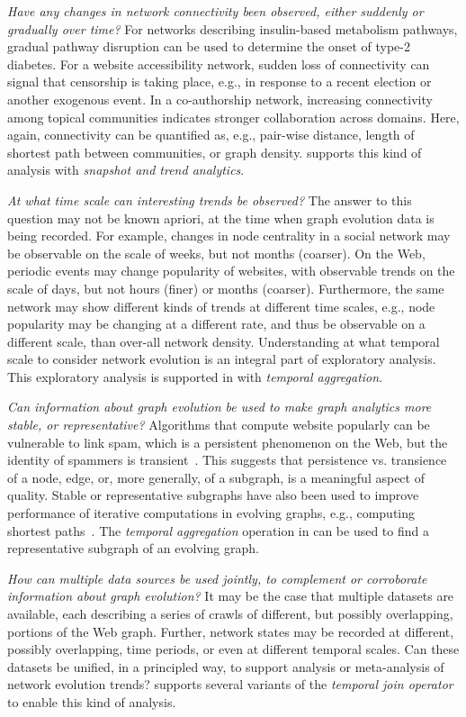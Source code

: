 {\em Have any changes in network connectivity been observed, either
  suddenly or gradually over time?}  For networks describing
insulin-based metabolism pathways, gradual pathway disruption can be
used to determine the onset of type-2 diabetes.  For a website
accessibility network, sudden loss of connectivity can signal that
censorship is taking place, e.g., in response to a recent election or
another exogenous event.  In a co-authorship network, increasing
connectivity among topical communities indicates stronger
collaboration across domains.  Here, again, connectivity can be
quantified as, e.g., pair-wise distance, length of shortest path
between communities, or graph density.  \ql supports this kind of
analysis with {\em snapshot and trend analytics}.

{\em At what time scale can interesting trends be observed?} The
answer to this question may not be known apriori, at the time when
graph evolution data is being recorded.  For example, changes in node
centrality in a social network may be observable on the scale of
weeks, but not months (coarser).  On the Web, periodic events may
change popularity of websites, with observable trends on the scale of
days, but not hours (finer) or months (coarser).  Furthermore, the
same network may show different kinds of trends at different time
scales, e.g., node popularity may be changing at a different rate, and
thus be observable on a different scale, than over-all network
density.  Understanding at what temporal scale to consider network
evolution is an integral part of exploratory analysis.  This
exploratory analysis is supported in \ql with {\em temporal
  aggregation}.

{\em Can information about graph evolution be used to make graph
  analytics more stable, or representative?}  Algorithms that compute
website popularly can be vulnerable to link spam, which is a
persistent phenomenon on the Web, but the identity of spammers is
transient~\cite{DBLP:conf/cikm/YangQZGL07}.  This suggests that
persistence vs. transience of a node, edge, or, more generally, of a
subgraph, is a meaningful aspect of quality.  Stable or representative
subgraphs have also been used to improve performance of iterative
computations in evolving graphs, e.g., computing shortest
paths~\cite{Ren2011}.  The {\em temporal aggregation} operation in
\ql {}can be used to find a
representative subgraph of an evolving graph.

{\em How can multiple data sources be used jointly, to complement or
  corroborate information about graph evolution?}  It may be the case
that multiple datasets are available, each describing a series of
crawls of different, but possibly overlapping, portions of the Web
graph.  Further, network states may be recorded at different, possibly
overlapping, time periods, or even at different temporal scales.  Can
these datasets be unified, in a principled way, to support analysis or
meta-analysis of network evolution trends?  \ql supports several
variants of the {\em temporal join operator} to enable this kind of
analysis.

